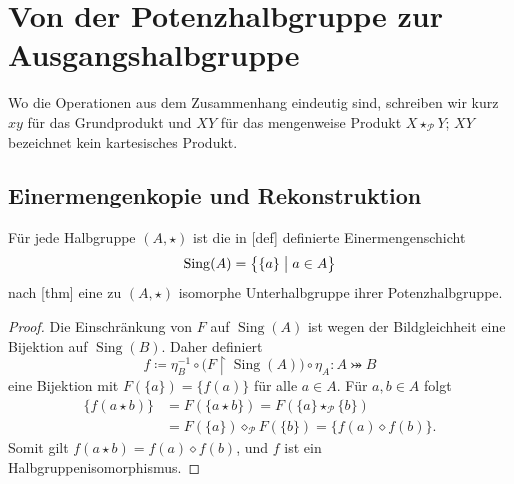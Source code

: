 \documentclass[main.tex]{subfiles}
\begin{document}
\chapter{Von der Potenzhalbgruppe zur Ausgangshalbgruppe}

Wo die Operationen aus dem Zusammenhang eindeutig sind, schreiben wir kurz
\(xy\) für das Grundprodukt und \(XY\) für das mengenweise Produkt
\(X\star_{\mathcal P}Y\); \(XY\) bezeichnet kein kartesisches Produkt.

\section{Einermengenkopie und Rekonstruktion}

Für jede Halbgruppe \((A,\star)\) ist die in
[def] definierte
Einermengenschicht
\[
  \operatorname{Sing}(A)=\bigl\{\{a\}\bigm|a\in A\bigr\}
\]
nach [thm] eine zu
\((A,\star)\) isomorphe Unterhalbgruppe ihrer Potenzhalbgruppe.

\begin{proof}
Die Einschränkung von \(F\) auf \(\operatorname{Sing}(A)\) ist wegen der
Bildgleichheit eine Bijektion auf \(\operatorname{Sing}(B)\).  Daher definiert
\[
  f\coloneqq
  \eta_B^{-1}\circ
  \bigl(F\upharpoonright\operatorname{Sing}(A)\bigr)\circ\eta_A
  \colon A\bij B
\]
eine Bijektion mit \(F(\{a\})=\{f(a)\}\) für alle \(a\in A\).  Für
\(a,b\in A\) folgt
\[
\begin{aligned}
  \{f(a\star b)\}
  &=F(\{a\star b\})
   =F(\{a\}\star_{\mathcal P}\{b\})\\
  &=F(\{a\})\diamond_{\mathcal P}F(\{b\})
   =\{f(a)\diamond f(b)\}.
\end{aligned}
\]
Somit gilt \(f(a\star b)=f(a)\diamond f(b)\), und \(f\) ist ein
Halbgruppenisomorphismus.
\end{proof}
\end{document}
